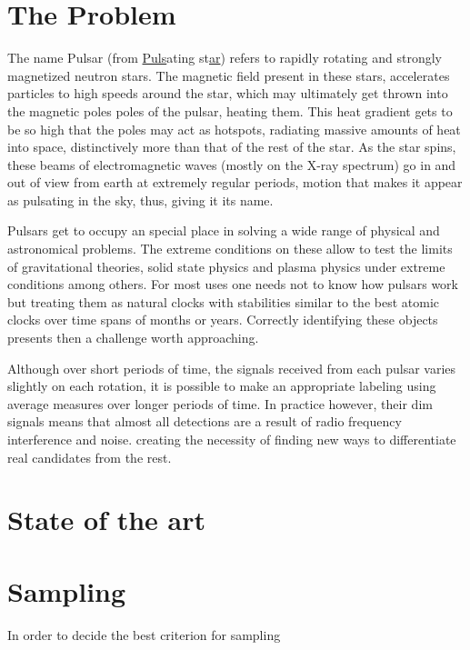 \documentclass[conference]{IEEEtran}
\begin{document}
\section{The Problem}
The name Pulsar (from \underline{Puls}ating st\underline{ar}) refers to rapidly
rotating and strongly magnetized neutron stars.\cite{pulsar:definition:nasa}
The magnetic field present in these stars, accelerates particles to high
speeds around the star, which may ultimately get thrown into the magnetic
poles poles of the pulsar, heating them. This heat gradient gets to be so high
that the poles may act as hotspots, radiating massive amounts of heat into space,
distinctively more than that of the rest of the star. As the star spins,
these beams of electromagnetic waves (mostly on the X-ray spectrum) go in and out
of view from earth at extremely regular periods, motion that makes it appear as
pulsating in the sky, thus, giving it its name.

Pulsars get to occupy an special place in solving a wide range of physical and
astronomical problems.\cite{pulsar:importance:kramer} The extreme conditions on
these allow to test the limits of gravitational theories, solid state physics and
plasma physics under extreme conditions among others. For most uses one needs
not to know how pulsars work but treating them as natural clocks with stabilities
similar to the best atomic clocks over time spans of months or years. 
Correctly identifying these objects presents then a challenge worth approaching.

Although over short periods of time, the signals received from each pulsar
varies slightly on each rotation,\cite{pulsar:importance:kramer} it is possible
to make an appropriate labeling using average measures over longer periods of time.
In practice however, their dim signals means that almost all detections are a
result of radio frequency interference and noise\cite{pulsar:dataset:explanation:lyon}.
creating the necessity of finding new ways to differentiate real candidates
from the rest.

\section{State of the art}

\todo{}

\section{Sampling}

In order to decide the best criterion for sampling
\end{document}
